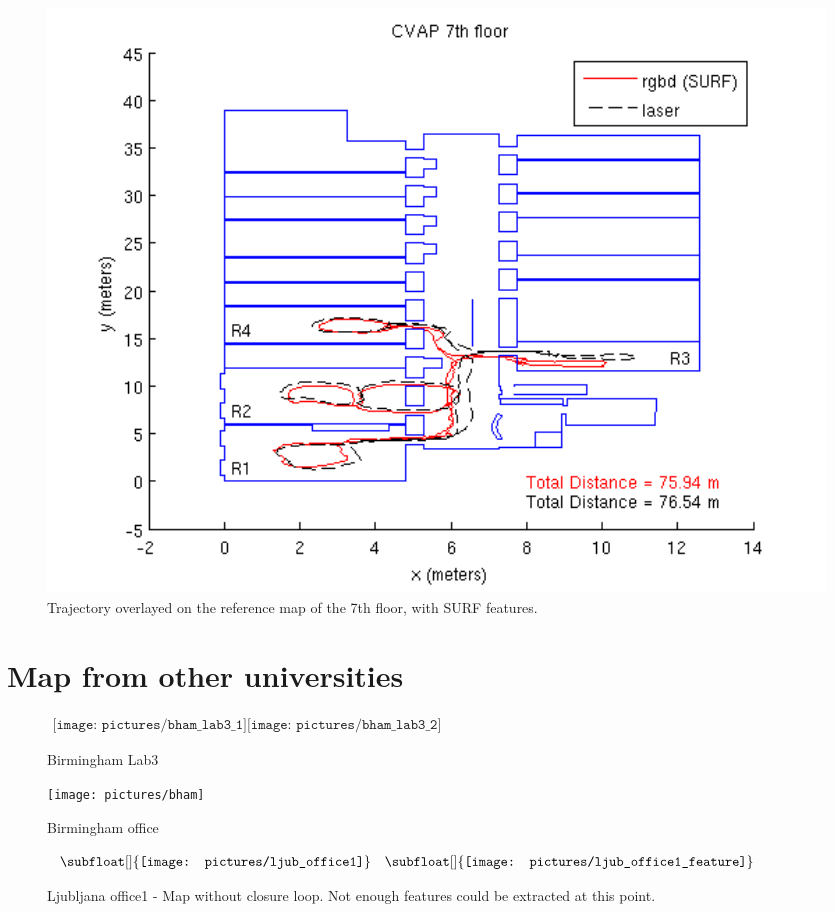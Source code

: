 \begin{figure}[H]
\centering
\includegraphics[width=1\textwidth]{figures/cvap_7th_4r_surf}
\caption{Trajectory overlayed on the reference map of the 7th floor, with SURF features.}
\end{figure}

\clearpage
\section{Map from other universities}

\begin{figure}[H]
\centering$
 \begin{array}{c}
 \texttt{[image: pictures/bham\_lab3\_1]}
 \texttt{[image: pictures/bham\_lab3\_2]}
 \end{array}$
\caption{Birmingham Lab3}
\end{figure}


\begin{figure}[H]
\centering
\texttt{[image: pictures/bham]}
\caption{Birmingham office}
\end{figure}

\begin{figure}[H]
\centering$
 \begin{array}{cc}
 \subfloat[]{\label{fig:ljub1_1} \texttt{[image: pictures/ljub\_office1]}} &
 \subfloat[]{\label{fig:ljub1_2} \texttt{[image: pictures/ljub\_office1\_feature]}}
 \end{array}$
\caption{Ljubljana office1 - \protect{} Map without closure loop. \protect{} Not enough features could be extracted at this point.}
\end{figure}


